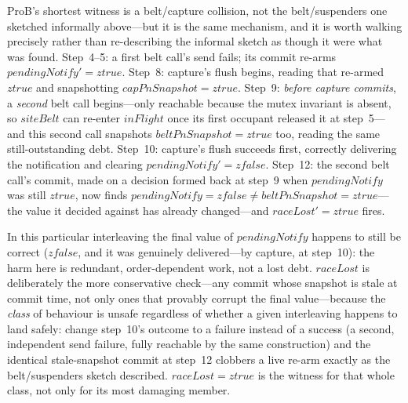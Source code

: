 \documentclass[a4paper,10pt,fleqn]{article}
\begin{document}
ProB's shortest witness is a belt/capture collision, not the
belt/suspenders one sketched informally above---but it is the same
mechanism, and it is worth walking precisely rather than
re-describing the informal sketch as though it were what was found.
Step~4--5: a first belt call's send fails; its commit re-arms
$pendingNotify' = ztrue$.  Step~8: capture's flush begins, reading
that re-armed $ztrue$ and snapshotting $capPnSnapshot = ztrue$.
Step~9: \emph{before capture commits}, a \emph{second} belt call
begins---only reachable because the mutex invariant is absent, so
$siteBelt$ can re-enter $inFlight$ once its first occupant released it
at step~5---and this second call snapshots $beltPnSnapshot = ztrue$
too, reading the same still-outstanding debt.  Step~10: capture's
flush succeeds first, correctly delivering the notification and
clearing $pendingNotify' = zfalse$.  Step~12: the second belt call's
commit, made on a decision formed back at step~9 when $pendingNotify$
was still $ztrue$, now finds $pendingNotify = zfalse \neq
beltPnSnapshot = ztrue$---the value it decided against has already
changed---and $raceLost' = ztrue$ fires.

In this particular interleaving the final value of $pendingNotify$
happens to still be correct ($zfalse$, and it was genuinely
delivered---by capture, at step~10): the harm here is redundant,
order-dependent work, not a lost debt.  $raceLost$ is deliberately the
more conservative check---any commit whose snapshot is stale at commit
time, not only ones that provably corrupt the final value---because
the \emph{class} of behaviour is unsafe regardless of whether a given
interleaving happens to land safely: change step~10's outcome to a
failure instead of a success (a second, independent send failure,
fully reachable by the same construction) and the identical
stale-snapshot commit at step~12 clobbers a live re-arm exactly as the
belt/suspenders sketch described.  $raceLost = ztrue$ is the witness
for that whole class, not only for its most damaging member.
\end{document}
